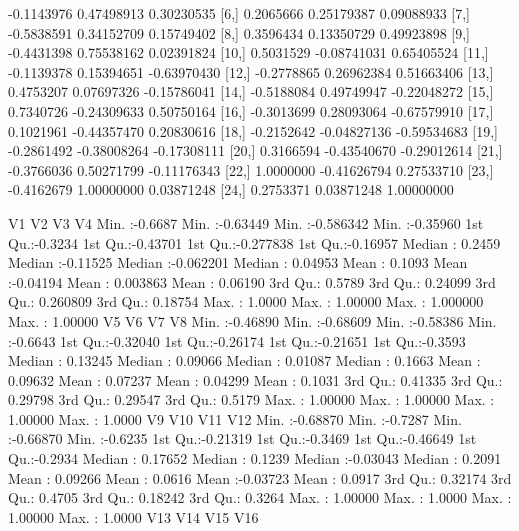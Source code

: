\documentclass[a4paper]{ article}
\begin{document}
\begin{table}[H]
\begin{Schunk}
\begin{Soutput}
 [5,] -0.1143976  0.47498913  0.30230535
 [6,]  0.2065666  0.25179387  0.09088933
 [7,] -0.5838591  0.34152709  0.15749402
 [8,]  0.3596434  0.13350729  0.49923898
 [9,] -0.4431398  0.75538162  0.02391824
[10,]  0.5031529 -0.08741031  0.65405524
[11,] -0.1139378  0.15394651 -0.63970430
[12,] -0.2778865  0.26962384  0.51663406
[13,]  0.4753207  0.07697326 -0.15786041
[14,] -0.5188084  0.49749947 -0.22048272
[15,]  0.7340726 -0.24309633  0.50750164
[16,] -0.3013699  0.28093064 -0.67579910
[17,]  0.1021961 -0.44357470  0.20830616
[18,] -0.2152642 -0.04827136 -0.59534683
[19,] -0.2861492 -0.38008264 -0.17308111
[20,]  0.3166594 -0.43540670 -0.29012614
[21,] -0.3766036  0.50271799 -0.11176343
[22,]  1.0000000 -0.41626794  0.27533710
[23,] -0.4162679  1.00000000  0.03871248
[24,]  0.2753371  0.03871248  1.00000000
\end{Soutput}
\begin{Soutput}
       V1                V2                 V3                  V4          
 Min.   :-0.6687   Min.   :-0.63449   Min.   :-0.586342   Min.   :-0.35960  
 1st Qu.:-0.3234   1st Qu.:-0.43701   1st Qu.:-0.277838   1st Qu.:-0.16957  
 Median : 0.2459   Median :-0.11525   Median :-0.062201   Median : 0.04953  
 Mean   : 0.1093   Mean   :-0.04194   Mean   : 0.003863   Mean   : 0.06190  
 3rd Qu.: 0.5789   3rd Qu.: 0.24099   3rd Qu.: 0.260809   3rd Qu.: 0.18754  
 Max.   : 1.0000   Max.   : 1.00000   Max.   : 1.000000   Max.   : 1.00000  
       V5                 V6                 V7                 V8         
 Min.   :-0.46890   Min.   :-0.68609   Min.   :-0.58386   Min.   :-0.6643  
 1st Qu.:-0.32040   1st Qu.:-0.26174   1st Qu.:-0.21651   1st Qu.:-0.3593  
 Median : 0.13245   Median : 0.09066   Median : 0.01087   Median : 0.1663  
 Mean   : 0.09632   Mean   : 0.07237   Mean   : 0.04299   Mean   : 0.1031  
 3rd Qu.: 0.41335   3rd Qu.: 0.29798   3rd Qu.: 0.29547   3rd Qu.: 0.5179  
 Max.   : 1.00000   Max.   : 1.00000   Max.   : 1.00000   Max.   : 1.0000  
       V9                V10               V11                V12         
 Min.   :-0.68870   Min.   :-0.7287   Min.   :-0.66870   Min.   :-0.6235  
 1st Qu.:-0.21319   1st Qu.:-0.3469   1st Qu.:-0.46649   1st Qu.:-0.2934  
 Median : 0.17652   Median : 0.1239   Median :-0.03043   Median : 0.2091  
 Mean   : 0.09266   Mean   : 0.0616   Mean   :-0.03723   Mean   : 0.0917  
 3rd Qu.: 0.32174   3rd Qu.: 0.4705   3rd Qu.: 0.18242   3rd Qu.: 0.3264  
 Max.   : 1.00000   Max.   : 1.0000   Max.   : 1.00000   Max.   : 1.0000  
      V13                V14                V15                V16          

\end{Soutput}
\end{Schunk}
\end{table}
\end{document}
